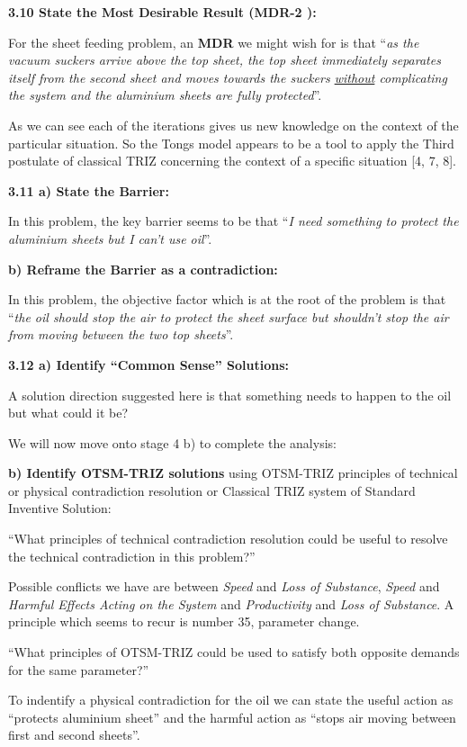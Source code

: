 \documentclass[11pt,a4paper]{article}
\begin{document}
\textbf{3.10 State the Most Desirable Result (MDR-2 ):}

For the sheet feeding problem, an \textbf{MDR} we might wish for is that
“\emph{as the vacuum suckers arrive above the top sheet, the top sheet
  immediately separates itself from the second sheet and moves towards the
  suckers \underline{without} complicating the system and the aluminium sheets
  are fully protected}”.

As we can see each of the iterations gives us new knowledge on the context of
the particular situation.  So the Tongs model appears to be a tool to apply
the Third postulate of classical TRIZ concerning the context of a specific
situation [4, 7, 8].

\textbf{3.11 a) State the Barrier:}

In this problem, the key barrier seems to be that “\emph{I need something to
  protect the aluminium sheets but I can’t use oil}”.

\textbf{b) Reframe the Barrier as a contradiction:}

In this problem, the objective factor which is at the root of the problem is
that “\emph{the oil should stop the air to protect the sheet surface but
  shouldn’t stop the air from moving between the two top sheets}”.

\textbf{3.12 a) Identify “Common Sense” Solutions:}

A solution direction suggested here is that something needs to happen to the
oil but what could it be?

We will now move onto stage 4 b) to complete the analysis:

\textbf{b) Identify OTSM-TRIZ solutions} using OTSM-TRIZ principles of
technical or physical contradiction resolution or Classical TRIZ system of
Standard Inventive Solution:

“What principles of technical contradiction resolution could be useful to
resolve the technical contradiction in this problem?”

Possible conflicts we have are between \emph{Speed} and \emph{Loss of
  Substance}, \emph{Speed} and \emph{Harmful Effects Acting on the System} and
\emph{Productivity} and \emph{Loss of Substance}.  A principle which seems to
recur is number 35, parameter change.

“What principles of OTSM-TRIZ could be used to satisfy both opposite demands
for the same parameter?”

To indentify a physical contradiction for the oil we can state the useful
action as “protects aluminium sheet” and the harmful action as “stops air
moving between first and second sheets”.
\end{document}
